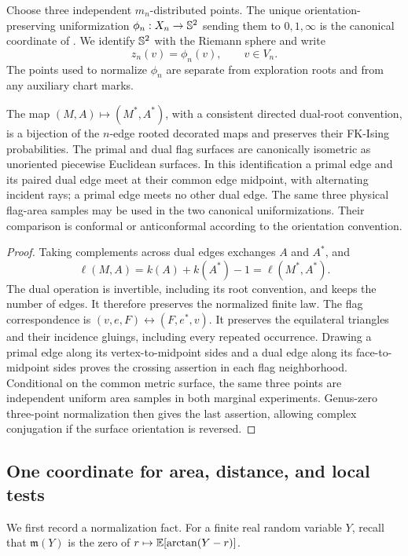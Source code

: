 Choose three independent \(m_n\)-distributed points.  The unique
orientation-preserving uniformization
\(\phi_n:X_n\to\mathbb S^2\) sending them to \(0,1,\infty\) is the canonical
coordinate of \cite[Section~2]{C}.  We identify \(\mathbb S^2\) with the Riemann
sphere and write
\[
 z_n(v)=\phi_n(v),\qquad v\in V_n.
\]
The points used to normalize \(\phi_n\) are separate from exploration roots
and from any auxiliary chart marks.

\begin{lemma}\label{lem:dual-geometry}
The map \((M,A)\mapsto(M^*,A^*)\), with a consistent directed dual-root
convention, is a bijection of the \(n\)-edge rooted decorated maps and
preserves their FK-Ising probabilities.  The primal and dual flag surfaces
are canonically isometric as unoriented piecewise Euclidean surfaces.  In
this identification a primal edge and its paired dual edge meet at their
common edge midpoint, with alternating incident rays; a primal edge meets no
other dual edge.  The same three physical flag-area samples may be used in
the two canonical uniformizations.  Their comparison is conformal or
anticonformal according to the orientation convention.
\end{lemma}

\begin{proof}
Taking complements across dual edges exchanges \(A\) and \(A^*\), and
\[
 \ell(M,A)=k(A)+k(A^*)-1=\ell(M^*,A^*).
\]
The dual operation is invertible, including its root convention, and keeps
the number of edges.  It therefore preserves the normalized finite law.
The flag correspondence is
\((v,e,F)\leftrightarrow(F,e^*,v)\).  It preserves the equilateral triangles
and their incidence gluings, including every repeated occurrence.  Drawing
a primal edge along its vertex-to-midpoint sides and a dual edge along its
face-to-midpoint sides proves the crossing assertion in each flag
neighborhood.  Conditional on the common metric surface, the same three
points are independent uniform area samples in both marginal experiments.
Genus-zero three-point normalization then gives the last assertion, allowing
complex conjugation if the surface orientation is reversed.
\end{proof}

\subsection{One coordinate for area, distance, and local tests}

We first record a normalization fact.  For a finite real random variable
\(Y\), recall that \(\mathfrak m(Y)\) is the zero of
\(r\mapsto\mathbb E[\arctan(Y-r)]\).

